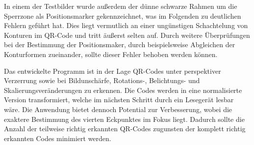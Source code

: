 \documentclass[a4paper, oneside, 12pt]{article}
\begin{document}
In einem der Testbilder wurde außerdem der dünne schwarze Rahmen um die Sperrzone als Positionsmarker gekennzeichnet, was im Folgenden zu deutlichen Fehlern geführt hat. Dies liegt vermutlich an einer ungünstigen Schachtelung von Konturen im QR-Code und tritt äußerst selten auf. Durch weitere Überprüfungen bei der Bestimmung der Positionsmaker, durch beispielsweise Abgleichen der Konturformen zueinander, sollte dieser Fehler behoben werden können.

Das entwickelte Programm ist in der Lage QR-Codes unter perspektiver Verzerrung sowie bei Bildunschärfe, Rotations-, Belichtungs- und Skalierungsveränderungen zu erkennen. Die Codes werden in eine normalisierte Version transformiert, welche im nächsten Schritt durch ein Lesegerät lesbar wäre. Die Anwendung bietet dennoch Potential zur Verbesserung, wobei die exaktere Bestimmung des vierten Eckpunktes im Fokus liegt. Dadurch sollte die Anzahl der teilweise richtig erkannten QR-Codes zugunsten der komplett richtig erkannten Codes minimiert werden.
\end{document}
